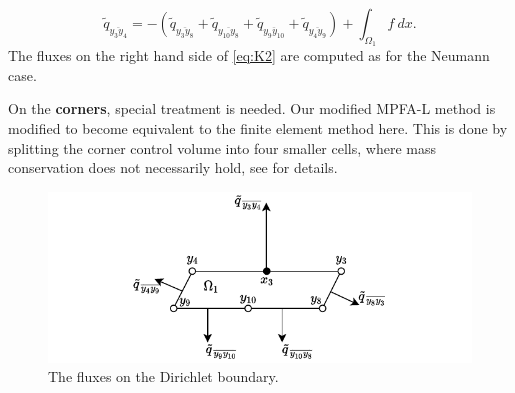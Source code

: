 \documentclass[../Main/main.tex]{subfiles}
\begin{document}
	\begin{equation}\label{eq:K2}
		\tilde{q}_{\overline{y_3 y_4}} =-( \tilde{q}_{\overline{y_3 y_8}} + \tilde{q}_{\overline{y_{10} y_{8}}}+\tilde{q}_{\overline{y_{9}y_{10}}}+\tilde{q}_{\overline{y_4 y_9}}) + \int_{\Omega_1} f \ dx.
	\end{equation}
	The fluxes on the right hand side of \eqref{eq:K2} are computed as for the Neumann case.
	\par
	On the \textbf{corners}, special treatment is needed. Our modified MPFA-L method is modified to become equivalent to the  finite element method here. This is done by splitting the corner control volume into four smaller cells, where mass conservation does not necessarily hold, see \cite{https://doi.org/10.1002/num.20525} for details.
	\begin{figure}
		\centering
		\includegraphics{boundary volume Dirichlet.pdf}
		\caption{The fluxes on the Dirichlet boundary. }
		\label{fig:boundary volume Dirichlet}
	\end{figure}
\end{document}
